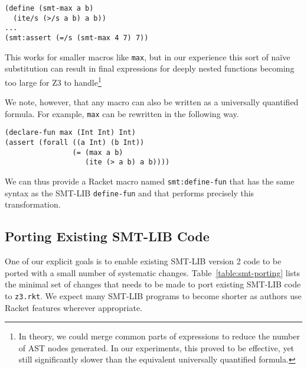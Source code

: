 \begin{verbatim}
(define (smt-max a b)
  (ite/s (>/s a b) a b))
...
(smt:assert (=/s (smt-max 4 7) 7))
\end{verbatim}

This works for smaller macros like \texttt{max}, but in our experience this
sort of na\"{i}ve substitution can result in final expressions for deeply
nested functions becoming too large for Z3 to handle\footnote{In theory, we
could merge common parts of expressions to reduce the number of AST nodes
generated. In our experiments, this proved to be effective, yet still
significantly slower than the equivalent universally quantified formula.}

We note, however, that any macro can also be written as a universally
quantified formula. For example, \texttt{max} can be rewritten in the
following way.

\begin{verbatim}
(declare-fun max (Int Int) Int)
(assert (forall ((a Int) (b Int))
                (= (max a b)
                   (ite (> a b) a b))))
\end{verbatim}

We can thus provide a Racket macro named \texttt{smt:define-fun} that has the
same syntax as the SMT-LIB \texttt{define-fun} and that performs precisely
this transformation.

\subsection{Porting Existing SMT-LIB Code}
\label{sec:porting-smt-lib}

One of our explicit goals is to enable existing SMT-LIB version 2 code to be
ported with a small number of systematic changes. Table~\ref{table:smt-porting}
lists the minimal set of changes that needs to be made to port
existing SMT-LIB code to \texttt{z3.rkt}. We expect many SMT-LIB programs
to become shorter as authors use Racket features wherever appropriate.

